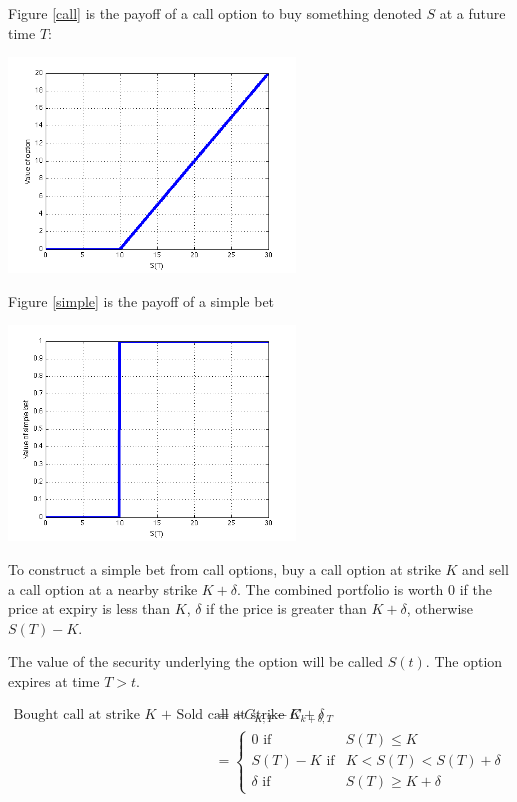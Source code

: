 Figure \ref{call} is the payoff of a call option to buy something denoted $S$ at a future time $T$:

 \begin{center}
\includegraphics[width=3in]{pics/calloption}%
\label{call}%
\end{center}

Figure \ref{simple} is the payoff of a simple bet

 \begin{center}
\includegraphics[width=3in]{pics/simplebet}%
\label{simple}%
\end{center}


To construct a simple bet from call options, buy a call option at strike $K$ and sell a call option at  a nearby strike $K+\delta$. The combined portfolio is worth 0 if the price at expiry is less than $K$, $\delta$ if the price is greater than $K+\delta$, otherwise $S(T)-K$.

The value of the security underlying the option will be called $S(t)$. The option expires at time $T>t$. 

\begin{eqnarray*}
\mbox{Bought call at strike $K$ + Sold call at strike $K+\delta$ }&= +C_{K,T}-C_{k+\delta,T}\\
&= 
\begin{cases} 
0 \mbox{ if } & S(T)\leq K \\ 
S(T)-K \mbox{ if} &K < S(T)< S(T)+\delta \\
 \delta \mbox{ if } &S(T)  \geq K+\delta 
 \end{cases} 
 \end{eqnarray*}

